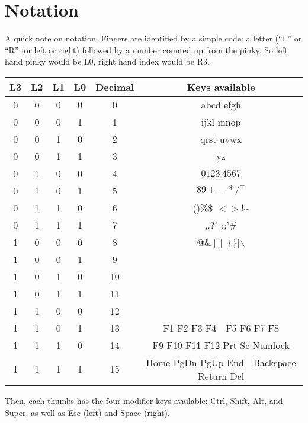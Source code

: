 \documentclass{report}
\begin{document}
\section*{Notation}
A quick note on notation. Fingers are identified by a simple code: a letter (``L'' or ``R'' for left or right) followed by a number counted up from the pinky. So left hand pinky would be L0, right hand index would be R3.

\begin{center}
\begin{tabular}{|c|c|c|c|c|c|}
  \hline
  L3 & L2 & L1 & L0 & Decimal & Keys available \\ \hline
  0  & 0  & 0  & 0  & 0  & abcd efgh \\ \hline
  0  & 0  & 0  & 1  & 1  & ijkl mnop \\ \hline
  0  & 0  & 1  & 0  & 2  & qrst uvwx \\ \hline
  0  & 0  & 1  & 1  & 3  & yz \\ \hline
  0  & 1  & 0  & 0  & 4  & $0123\ 4567$ \\ \hline
  0  & 1  & 0  & 1  & 5  & $89+-\ */^=$ \\ \hline
  0  & 1  & 1  & 0  & 6  & ()\%\$ $<>$!\textasciitilde \\ \hline
  0  & 1  & 1  & 1  & 7  & ,.?" :;'\#\\ \hline
  1  & 0  & 0  & 0  & 8  & @\&$[]$ $\{\}|\backslash$ \\ \hline
  1  & 0  & 0  & 1  & 9  &  \\ \hline
  1  & 0  & 1  & 0  & 10 &  \\ \hline
  1  & 0  & 1  & 1  & 11 &  \\ \hline
  1  & 1  & 0  & 0  & 12 &  \\ \hline
  1  & 1  & 0  & 1  & 13 & F1 F2 F3 F4\ \ F5 F6 F7 F8 \\ \hline
  1  & 1  & 1  & 0  & 14 & F9 F10 F11 F12 Prt Sc Numlock \\ \hline
  1  & 1  & 1  & 1  & 15 & Home PgDn PgUp End\ \ Backspace Return Del \\ \hline
\end{tabular}
\end{center}

Then, each thumbs has the four modifier keys available: Ctrl, Shift, Alt, and Super, as well as Esc (left) and Space (right).
\end{document}
